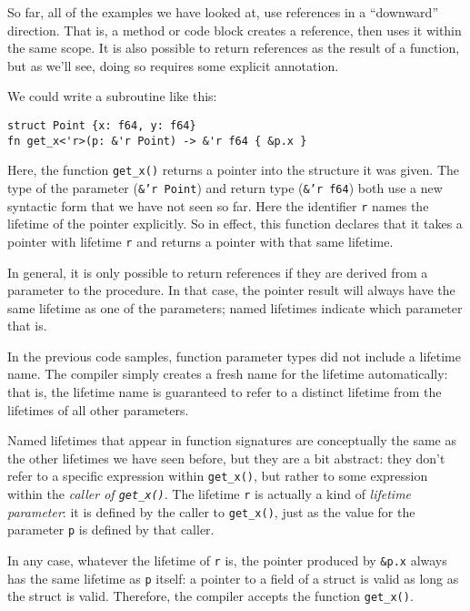 \documentclass[]{article}
\begin{document}
So far, all of the examples we have looked at, use references in a
``downward'' direction. That is, a method or code block creates a
reference, then uses it within the same scope. It is also possible to
return references as the result of a function, but as we'll see, doing
so requires some explicit annotation.

We could write a subroutine like this:

\begin{verbatim}
struct Point {x: f64, y: f64}
fn get_x<'r>(p: &'r Point) -> &'r f64 { &p.x }
\end{verbatim}

Here, the function \texttt{get\_x()} returns a pointer into the
structure it was given. The type of the parameter (\texttt{\&'r Point})
and return type (\texttt{\&'r f64}) both use a new syntactic form that
we have not seen so far. Here the identifier \texttt{r} names the
lifetime of the pointer explicitly. So in effect, this function declares
that it takes a pointer with lifetime \texttt{r} and returns a pointer
with that same lifetime.

In general, it is only possible to return references if they are derived
from a parameter to the procedure. In that case, the pointer result will
always have the same lifetime as one of the parameters; named lifetimes
indicate which parameter that is.

In the previous code samples, function parameter types did not include a
lifetime name. The compiler simply creates a fresh name for the lifetime
automatically: that is, the lifetime name is guaranteed to refer to a
distinct lifetime from the lifetimes of all other parameters.

Named lifetimes that appear in function signatures are conceptually the
same as the other lifetimes we have seen before, but they are a bit
abstract: they don't refer to a specific expression within
\texttt{get\_x()}, but rather to some expression within the \emph{caller
of \texttt{get\_x()}}. The lifetime \texttt{r} is actually a kind of
\emph{lifetime parameter}: it is defined by the caller to
\texttt{get\_x()}, just as the value for the parameter \texttt{p} is
defined by that caller.

In any case, whatever the lifetime of \texttt{r} is, the pointer
produced by \texttt{\&p.x} always has the same lifetime as \texttt{p}
itself: a pointer to a field of a struct is valid as long as the struct
is valid. Therefore, the compiler accepts the function
\texttt{get\_x()}.
\end{document}
